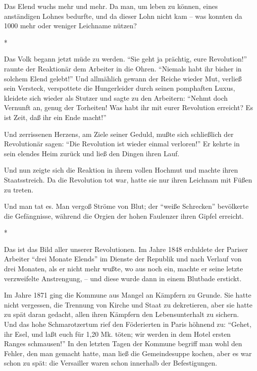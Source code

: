 \documentclass{scrbook}
\begin{document}
Das Elend wuchs mehr und mehr. Da man, um leben zu können, eines anständigen Lohnes bedurfte, und da dieser Lohn nicht kam – was konnten da 1000 mehr oder weniger Leichname nützen?

\begin{center}*\end{center}

Das Volk begann jetzt müde zu werden. ``Sie geht ja prächtig, eure Revolution!'' raunte der Reaktionär dem Arbeiter in die Ohren. ``Niemals habt ihr bisher in solchem Elend gelebt!'' Und allmählich gewann der Reiche wieder Mut, verließ sein Versteck, verspottete die Hungerleider durch seinen pomphaften Luxus, kleidete sich wieder als Stutzer und sagte zu den Arbeitern: ``Nehmt doch Vernunft an, genug der Torheiten! Was habt ihr mit eurer Revolution erreicht? Es ist Zeit, daß ihr ein Ende macht!''

Und zerrissenen Herzens, am Ziele seiner Geduld, mußte sich schließlich der Revolutionär sagen: ``Die Revolution ist wieder einmal verloren!'' Er kehrte in sein elendes Heim zurück und ließ den Dingen ihren Lauf.

Und nun zeigte sich die Reaktion in ihrem vollen Hochmut und machte ihren Staatsstreich. Da die Revolution tot war, hatte sie nur ihren Leichnam mit Füßen zu treten.

Und man tat es. Man vergoß Ströme von Blut; der ``weiße Schrecken'' bevölkerte die Gefängnisse, während die Orgien der hohen Faulenzer ihren Gipfel erreicht.

\begin{center}*\end{center}

Das ist das Bild aller unserer Revolutionen. Im Jahre 1848 erduldete der Pariser Arbeiter ``drei Monate Elends'' im Dienste der Republik und nach Verlauf von drei Monaten, als er nicht mehr wußte, wo aus noch ein, machte er seine letzte verzweifelte Anstrengung, – und diese wurde dann in einem Blutbade erstickt.

Im Jahre 1871 ging die Kommune aus Mangel an Kämpfern zu Grunde. Sie hatte nicht vergessen, die Trennung von Kirche und Staat zu dekretieren, aber sie hatte zu spät daran gedacht, allen ihren Kämpfern den Lebensunterhalt zu sichern. Und das hohe Schmarotzertum rief den Föderierten in Paris höhnend zu: ``Gehet, ihr Esel, und laßt euch für 1,20 Mk. töten; wir werden in dem Hotel ersten Ranges schmausen!'' In den letzten Tagen der Kommune begriff man wohl den Fehler, den man gemacht hatte, man ließ die Gemeindesuppe kochen, aber es war schon zu spät: die Versailler waren schon innerhalb der Befestigungen.
\end{document}

